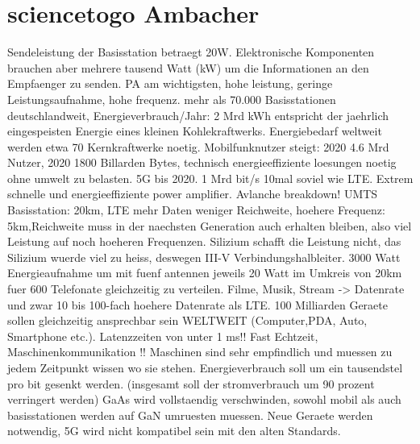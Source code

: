 \chapter{sciencetogo Ambacher}
Sendeleistung der Basisstation betraegt 20W. Elektronische Komponenten brauchen aber mehrere tausend Watt (kW) um die Informationen an den Empfaenger zu senden. PA am wichtigsten, hohe leistung, geringe Leistungsaufnahme, hohe frequenz. mehr als 70.000 Basisstationen deutschlandweit, Energieverbrauch/Jahr: 2 Mrd kWh entspricht der jaehrlich eingespeisten Energie eines kleinen Kohlekraftwerks. Energiebedarf weltweit werden etwa 70 Kernkraftwerke noetig. Mobilfunknutzer steigt: 2020 4.6 Mrd Nutzer, 2020 1800 Billarden Bytes, technisch energieeffiziente loesungen noetig ohne umwelt zu belasten. 5G bis 2020. 1 Mrd bit/s 10mal soviel wie LTE. Extrem schnelle und energieeffiziente power amplifier. Avlanche breakdown! UMTS Basisstation: 20km, LTE mehr Daten weniger Reichweite, hoehere Frequenz: 5km,Reichweite muss in der naechsten Generation auch erhalten bleiben, also viel Leistung auf noch hoeheren Frequenzen. Silizium schafft die Leistung nicht, das Silizium wuerde viel zu heiss, deswegen III-V Verbindungshalbleiter. 3000 Watt Energieaufnahme um mit fuenf antennen jeweils 20 Watt im Umkreis von 20km fuer 600 Telefonate gleichzeitig zu verteilen. Filme, Musik, Stream -> Datenrate und zwar 10 bis 100-fach hoehere Datenrate als LTE. 100 Milliarden Geraete sollen gleichzeitig ansprechbar sein WELTWEIT (Computer,PDA, Auto, Smartphone etc.). Latenzzeiten von unter 1 ms!! Fast Echtzeit, Maschinenkommunikation !! Maschinen sind sehr empfindlich und muessen zu jedem Zeitpunkt wissen wo sie stehen. Energieverbrauch soll um ein tausendstel pro bit gesenkt werden. (insgesamt soll der stromverbrauch um 90 prozent verringert werden) GaAs wird vollstaendig verschwinden, sowohl mobil als auch basisstationen werden auf GaN umruesten muessen. Neue Geraete werden notwendig, 5G wird nicht kompatibel sein mit den alten Standards. 